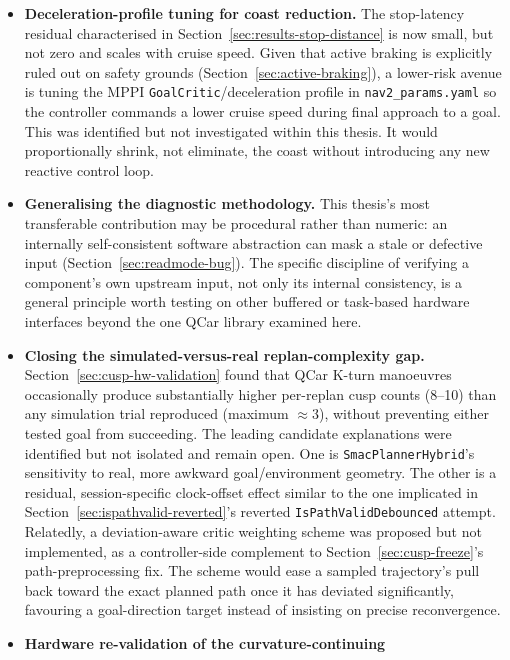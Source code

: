 \begin{itemize}
    mapping used throughout this thesis.
  \item \textbf{Deceleration-profile tuning for coast reduction.} The
    stop-latency residual characterised in Section~\ref{sec:results-stop-distance}
    is now small, but not zero and scales with cruise speed. Given
    that active braking is explicitly ruled out on safety grounds
    (Section~\ref{sec:active-braking}), a lower-risk avenue is tuning
    the MPPI \texttt{GoalCritic}/deceleration profile in
    \texttt{nav2\_params.yaml} so the controller commands a lower
    cruise speed during final approach to a goal. This was identified
    but not investigated within this thesis. It would proportionally
    shrink, not eliminate, the coast without introducing any new
    reactive control loop.
  \item \textbf{Generalising the diagnostic methodology.} This
    thesis's most transferable contribution may be procedural rather
    than numeric: an internally self-consistent software abstraction
    can mask a stale or defective input (Section~\ref{sec:readmode-bug}).
    The specific discipline of verifying a component's own upstream
    input, not only its internal consistency, is a general principle
    worth testing on other buffered or task-based hardware interfaces
    beyond the one QCar library examined here.
  \item \textbf{Closing the simulated-versus-real replan-complexity gap.}
    Section~\ref{sec:cusp-hw-validation} found that QCar K-turn
    manoeuvres occasionally produce substantially higher per-replan
    cusp counts (8--10) than any simulation trial reproduced (maximum
    $\approx$3), without preventing either tested goal from succeeding.
    The leading candidate explanations were identified but not
    isolated and remain open. One is \texttt{SmacPlannerHybrid}'s
    sensitivity to real, more awkward goal/environment geometry. The
    other is a residual, session-specific clock-offset effect similar
    to the one implicated in Section~\ref{sec:ispathvalid-reverted}'s
    reverted \texttt{IsPathValidDebounced} attempt. Relatedly, a
    deviation-aware critic weighting scheme was proposed but not
    implemented, as a controller-side complement to
    Section~\ref{sec:cusp-freeze}'s path-preprocessing fix. The scheme
    would ease a sampled trajectory's pull back toward the exact
    planned path once it has deviated significantly, favouring a
    goal-direction target instead of insisting on precise
    reconvergence.
  \item \textbf{Hardware re-validation of the curvature-continuing
}
\end{itemize}
